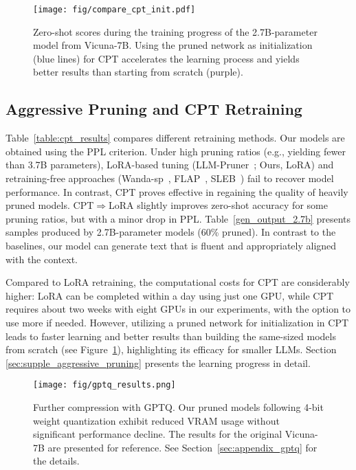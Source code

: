 \begin{figure}[t]
  \centering
    \texttt{[image: fig/compare\_cpt\_init.pdf]}
  \caption{Zero-shot scores during the training progress of the 2.7B-parameter model from Vicuna-7B. Using the pruned network as initialization (blue lines) for CPT accelerates the learning process and yields better results than starting from scratch (purple).}
  \label{fig_learncurve_cpt}
  \vspace{-0.2in}
\end{figure}

\subsection{Aggressive Pruning and CPT Retraining}
Table~\ref{table:cpt_results} compares different retraining methods. Our models are obtained using the PPL criterion. Under high pruning ratios (e.g., yielding fewer than 3.7B parameters), LoRA-based tuning (LLM-Pruner~\cite{llmpruner}; Ours, LoRA) and retraining-free approaches (Wanda-sp~\cite{wanda,flap}, FLAP~\cite{flap}, SLEB~\cite{song2024sleb}) fail to recover model performance. In contrast, CPT proves effective in regaining the quality of heavily pruned models. CPT$\Rightarrow$LoRA slightly improves zero-shot accuracy for some pruning ratios, but with a minor drop in PPL. Table~\ref{gen_output_2.7b} presents samples produced by 2.7B-parameter models (60\% pruned). In contrast to the baselines, our model can generate text that is fluent and appropriately aligned with the context.

Compared to LoRA retraining, the computational costs for CPT are considerably higher: LoRA can be completed within a day using just one GPU, while CPT requires about two weeks with eight GPUs in our experiments, with the option to use more if needed. However, utilizing a pruned network for initialization in CPT leads to faster learning and better results than building the same-sized models from scratch (see Figure~\ref{fig_learncurve_cpt}), highlighting its efficacy for smaller LLMs. Section \ref{sec:supple_aggressive_pruning} presents the learning progress in detail.

\begin{figure}[t]
  \centering
    \texttt{[image: fig/gptq\_results.png]}
        \vspace{-0.25in}
  \caption{Further compression with GPTQ. Our pruned models following 4-bit weight quantization exhibit reduced VRAM usage without significant performance decline. The results for the original Vicuna-7B are presented for reference. See Section~\ref{sec:appendix_gptq} for the details.}
  \vspace{-0.1in}
  \label{fig_gptq_measure}
\end{figure}

